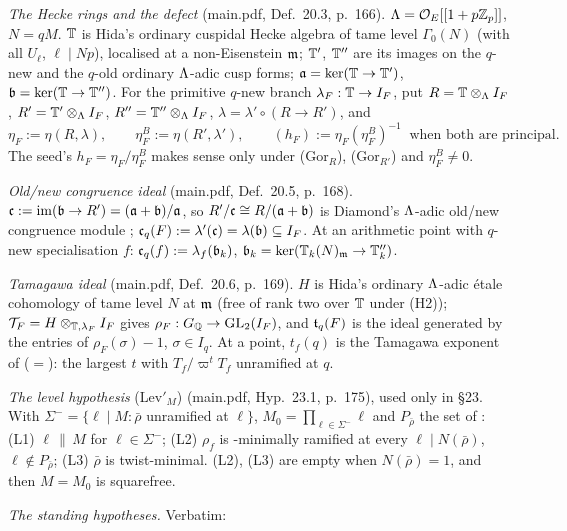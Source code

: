\emph{The Hecke rings and the defect} (main.pdf, Def.~20.3, p.~166). $\Lambda=\mathcal{O}_E[[1+p\mathbb{Z}_p]]$, $N=qM$. $\mathbb{T}$ is Hida's ordinary
cuspidal Hecke algebra of tame level $\Gamma_0(N)$ (with all $U_\ell$, $\ell\mid Np$), localised at a non-Eisenstein $\mathfrak{m}$; $\mathbb{T}'$, $\mathbb{T}''$
are its images on the $q$-new and the $q$-old ordinary $\Lambda$-adic cusp forms; $\mathfrak{a}=\ker(\mathbb{T}\to\mathbb{T}')$, $\mathfrak{b}=\ker(\mathbb{T}\to\mathbb{T}'')$. For the
primitive $q$-new branch $\lambda_F:\mathbb{T}\to I_F$, put $R=\mathbb{T}\otimes_\Lambda I_F$, $R'=\mathbb{T}'\otimes_\Lambda I_F$, $R''=\mathbb{T}''\otimes_\Lambda I_F$,
$\lambda=\lambda'\circ(R\to R')$, and
\[\eta_F:=\eta(R,\lambda),\qquad\eta^B_F:=\eta(R',\lambda'),\qquad(h_F):=\eta_F(\eta^B_F)^{-1}\ \text{ when both are principal.}\]
The seed's $h_F=\eta_F/\eta^B_F$ makes sense only under (Gor$_R$), (Gor$_{R'}$) and $\eta^B_F\ne0$.

\emph{Old/new congruence ideal} (main.pdf, Def.~20.5, p.~168). $\mathfrak{c}:=\mathrm{im}(\mathfrak{b}\to R')=(\mathfrak{a}+\mathfrak{b})/\mathfrak{a}$, so $R'/\mathfrak{c}\cong R/(\mathfrak{a}+\mathfrak{b})$
is Diamond's $\Lambda$-adic old/new congruence module \cite{Dia89}; $\mathfrak{c}_q(F):=\lambda'(\mathfrak{c})=\lambda(\mathfrak{b})\subseteq I_F$. At an arithmetic
point with $q$-new specialisation $f$: $\mathfrak{c}_q(f):=\lambda_f(\mathfrak{b}_k)$, $\mathfrak{b}_k=\ker(\mathbb{T}_k(N)_{\mathfrak{m}}\to\mathbb{T}''_k)$.

\emph{Tamagawa ideal} (main.pdf, Def.~20.6, p.~169). $H$ is Hida's ordinary $\Lambda$-adic étale cohomology of tame level $N$ at $\mathfrak{m}$
(free of rank two over $\mathbb{T}$ under (H2)); $\mathcal T_F=H\otimes_{\mathbb{T},\lambda_F}I_F$ gives $\rho_F:G_{\mathbb{Q}}\to\mathrm{GL}_2(I_F)$, and $\mathfrak{t}_q(F)$ is the
ideal generated by the entries of $\rho_F(\sigma)-1$, $\sigma\in I_q$. At a point, $t_f(q)$ is the Tamagawa exponent of
\cite[Def.~2.12]{KO} ($=$\cite[Def.~3.3]{PW}): the largest $t$ with $T_f/\varpi^tT_f$ unramified at $q$.

\emph{The level hypothesis} (Lev$'_M$) (main.pdf, Hyp.~23.1, p.~175), used only in \S23. With $\Sigma^-=\{\ell\mid M:\bar\rho$ unramified
at $\ell\}$, $M_0=\prod_{\ell\in\Sigma^-}\ell$ and $P_{\bar\rho}$ the set of \cite[(2.1)]{KO}: (L1) $\ell\,\|\,M$ for $\ell\in\Sigma^-$; (L2)
$\rho_f$ is \cite[Def.~3.5]{KO}-minimally ramified at every $\ell\mid N(\bar\rho)$, $\ell\notin P_{\bar\rho}$; (L3) $\bar\rho$ is
twist-minimal. (L2), (L3) are empty when $N(\bar\rho)=1$, and then $M=M_0$ is squarefree.

\emph{The standing hypotheses.} Verbatim:

